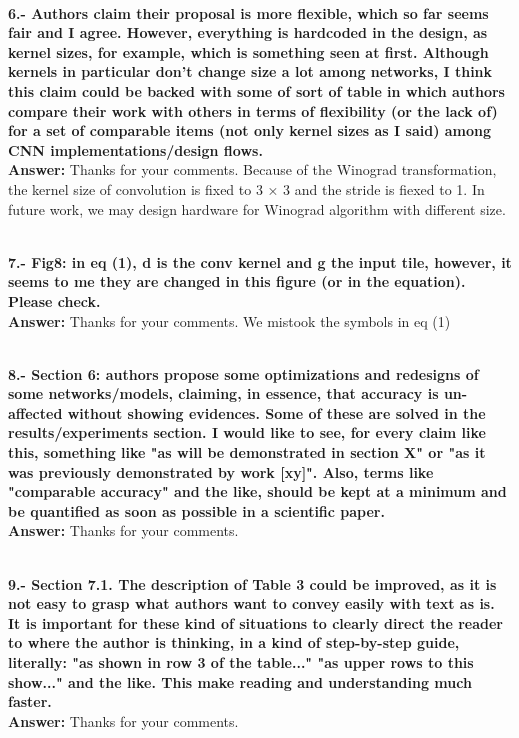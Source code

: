\documentclass[12pt]{paper}
\newcommand{\rev}[1]{{{\color[rgb]{0,0,1}{#1}}}}
\newcommand{\answer}[1]{\noindent\textbf{Answer:} #1}
\newcommand{\comment}[1]{\noindent\textbf{\\ #1}\\}
\begin{document}
\comment{6.- Authors claim their proposal is more flexible, which so far seems fair and I agree. However, everything is hardcoded in the design, as kernel sizes, for example, which is something seen at first. Although kernels in particular don't change size a lot among networks, I think this claim could be backed with some of sort of table in which authors compare their work with others in terms of flexibility (or the lack of) for a set of comparable items (not only kernel sizes as I said) among CNN implementations/design flows. }
\answer{Thanks for your comments. Because of the Winograd transformation, the kernel size of convolution is fixed to 3 × 3 and the stride is fiexed to 1. In future work, we may design hardware for Winograd algorithm with different size.\\}
\rev{We add a paragraph in section 5.2 to show a possible method to do $1 \time 1$ or $5 \time 5$ convolution by $3 \time 3$ convolver.\\}
\rev{We add a paragraph at the beginning of Section 6 to explain our ISA is designed for cross-layer scheduling and Winograd acceleration. Other the ISAs like CambrianX[15] is designed for various of NN algorithms, such as MLP, CNN and LSTM. Our ISA  is not as flexible as other work, yet our proposed ISA is very simple.\\
}
\rev{We add the comments in conclusion section(Section 9) to explain that we may design hardware for Winograd algorithm with different size in future.
}

\comment{7.- Fig8: in eq (1), d is the conv kernel and g the input tile, however, it seems to me they are changed in this figure (or in the equation). Please check.  }
\answer{Thanks for your comments. We mistook the symbols in eq (1)}
\rev{We have corrected this error.}

\comment{8.- Section 6: authors propose some optimizations and redesigns of some networks/models, claiming, in essence, that accuracy is un-affected without showing evidences. Some of these are solved in the results/experiments section. I would like to see, for every claim like this, something like "as will be demonstrated in section X" or "as it was previously demonstrated by work [xy]". Also, terms like "comparable accuracy" and the like, should be kept at a minimum and be quantified as soon as possible in a scientific paper. }
\answer{Thanks for your comments.}
\rev{We have corrected this error.}


\comment{9.- Section 7.1. The description of Table 3 could be improved, as it is not easy to grasp what authors want to convey easily with text as is. It is important for these kind of situations to clearly direct the reader to where the author is thinking, in a kind of step-by-step guide, literally: "as shown in row 3 of the table..." "as upper rows to this show..." and the like. This make reading and understanding much faster. }
\answer{Thanks for your comments.}
\rev{We have corrected this error.}
\end{document}
